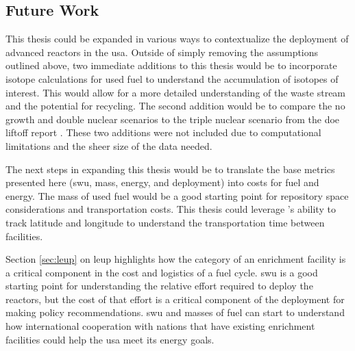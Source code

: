 


\subsection{Future Work}
\label{sec:future_work}

This thesis could be expanded in various ways to contextualize the deployment of advanced reactors in the \gls{usa}. Outside of simply removing the assumptions outlined above, two immediate additions to this thesis would be to incorporate isotope calculations for used fuel to understand the accumulation of isotopes of interest. This would allow for a more detailed understanding of the waste stream and the potential for recycling. The second addition would be to compare the no growth and double nuclear scenarios to the triple nuclear scenario from the \gls{doe} liftoff report \cite{julie_liftoff_pathways_2024}. These two additions were not included due to computational limitations and the sheer size of the data needed.

The next steps in expanding this thesis would be to translate the base metrics presented here (\gls{swu}, mass, energy, and deployment) into costs for fuel and energy. The mass of used fuel would be a good starting point for repository space considerations and transportation costs. This thesis could leverage \cyclus's ability to track latitude and longitude to understand the transportation time between facilities.

Section \ref{sec:leup} on \gls{leup} highlights how the category of an enrichment facility is a critical component in the cost and logistics of a fuel cycle. \gls{swu} is a good starting point for understanding the relative effort required to deploy the reactors, but the cost of that effort is a critical component of the deployment for making policy recommendations. \gls{swu} and masses of fuel can start to understand how international cooperation with nations that have existing enrichment facilities could help the \gls{usa} meet its energy goals.

